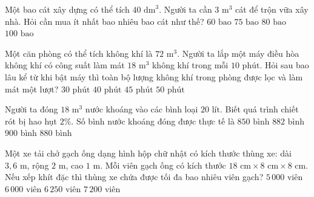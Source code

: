 \begin{ex} %
Một bao cát xây dựng có thể tích $40\text{ dm}^3$. Người ta cần $3\text{ m}^3$ cát để trộn vữa xây nhà. Hỏi cần mua ít nhất bao nhiêu bao cát như thế?
\choice
{$60\text{ bao}$}
{\True $75\text{ bao}$}
{$80\text{ bao}$}
{$100\text{ bao}$}
\end{ex}

\begin{ex} %
Một căn phòng có thể tích không khí là $72\text{ m}^3$. Người ta lắp một máy điều hòa không khí có công suất làm mát $18\text{ m}^3$ không khí trong mỗi $10\text{ phút}$. Hỏi sau bao lâu kể từ khi bật máy thì toàn bộ lượng không khí trong phòng được lọc và làm mát một lượt?
\choice
{$30\text{ phút}$}
{\True $40\text{ phút}$}
{$45\text{ phút}$}
{$50\text{ phút}$}
\end{ex}

\begin{ex} %
Người ta đóng $18\text{ m}^3$ nước khoáng vào các bình loại $20\text{ lít}$. Biết quá trình chiết rót bị hao hụt $2\%$. Số bình nước khoáng đóng được thực tế là
\choice
{$850\text{ bình}$}
{\True $882\text{ bình}$}
{$900\text{ bình}$}
{$880\text{ bình}$}
\end{ex}

\begin{ex} %
Một xe tải chở gạch ống dạng hình hộp chữ nhật có kích thước thùng xe: dài $3{,}6\text{ m}$, rộng $2\text{ m}$, cao $1\text{ m}$. Mỗi viên gạch ống có kích thước $18\text{ cm} \times 8\text{ cm} \times 8\text{ cm}$. Nếu xếp khít đặc thì thùng xe chứa được tối đa bao nhiêu viên gạch?
\choice
{$5\,000\text{ viên}$}
{\True $6\,000\text{ viên}$}
{$6\,250\text{ viên}$}
{$7\,200\text{ viên}$}
\end{ex}

